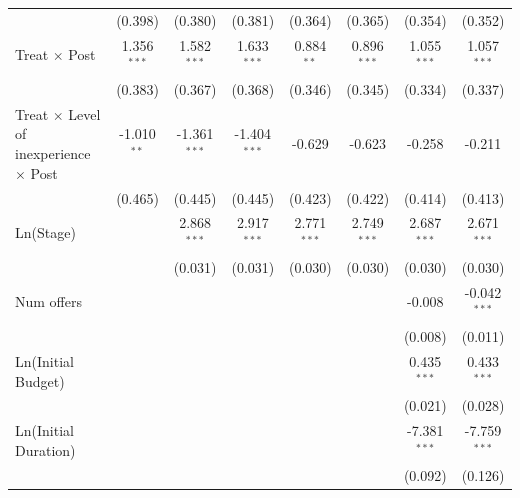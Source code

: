 \documentclass[
]{article}
\begin{document}
\begin{tabular}{lccccccc}
                                                        & (0.398)        & (0.380)        & (0.381)        & (0.364)        & (0.365)       & (0.354)        & (0.352)\\   
   Treat $\times$ Post                                  & 1.356$^{***}$  & 1.582$^{***}$  & 1.633$^{***}$  & 0.884$^{**}$   & 0.896$^{***}$ & 1.055$^{***}$  & 1.057$^{***}$\\   
                                                        & (0.383)        & (0.367)        & (0.368)        & (0.346)        & (0.345)       & (0.334)        & (0.337)\\   
   Treat $\times$ Level of inexperience $\times$ Post   & -1.010$^{**}$  & -1.361$^{***}$ & -1.404$^{***}$ & -0.629         & -0.623        & -0.258         & -0.211\\   
                                                        & (0.465)        & (0.445)        & (0.445)        & (0.423)        & (0.422)       & (0.414)        & (0.413)\\   
   Ln(Stage)                                            &                & 2.868$^{***}$  & 2.917$^{***}$  & 2.771$^{***}$  & 2.749$^{***}$ & 2.687$^{***}$  & 2.671$^{***}$\\   
                                                        &                & (0.031)        & (0.031)        & (0.030)        & (0.030)       & (0.030)        & (0.030)\\   
   Num offers                                           &                &                &                &                &               & -0.008         & -0.042$^{***}$\\   
                                                        &                &                &                &                &               & (0.008)        & (0.011)\\   
   Ln(Initial Budget)                                   &                &                &                &                &               & 0.435$^{***}$  & 0.433$^{***}$\\   
                                                        &                &                &                &                &               & (0.021)        & (0.028)\\   
   Ln(Initial Duration)                                 &                &                &                &                &               & -7.381$^{***}$ & -7.759$^{***}$\\   
                                                        &                &                &                &                &               & (0.092)        & (0.126)\\   

\end{tabular}
\end{document}
